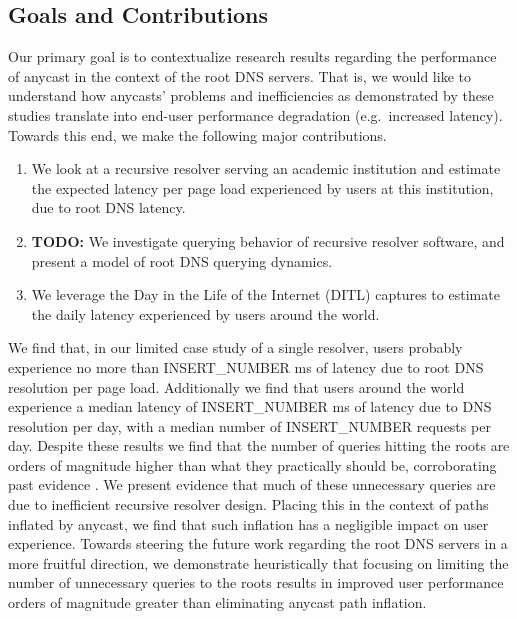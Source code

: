 \documentclass[sigconf,nonacm,10pt]{acmart}
\begin{document}
\subsection{Goals and Contributions}\label{goals-and-contributions}

\label{sec:goals_and_contrib} Our primary goal is to contextualize
research results regarding the performance of anycast in the context of
the root DNS servers. That is, we would like to understand how anycasts'
problems and inefficiencies as demonstrated by these studies translate
into end-user performance degradation (e.g.~increased latency). Towards
this end, we make the following major contributions.

\begin{enumerate}
        \item We look at a recursive resolver serving an academic institution and estimate the expected latency per page load experienced by users at this institution, due to root DNS latency.
        \item \textbf{TODO:} We investigate querying behavior of recursive resolver software, and present a model of root DNS querying dynamics.
\item We leverage the Day in the Life of the Internet (DITL) captures to estimate the daily latency experienced by users around the world.
\end{enumerate}

We find that, in our limited case study of a single resolver, users
probably experience no more than INSERT\_NUMBER ms of latency due to
root DNS resolution per page load. Additionally we find that users
around the world experience a median latency of INSERT\_NUMBER ms of
latency due to DNS resolution per day, with a median number of
INSERT\_NUMBER requests per day. Despite these results we find that the
number of queries hitting the roots are orders of magnitude higher than
what they practically should be, corroborating past evidence \cite{}. We
present evidence that much of these unnecessary queries are due to
inefficient recursive resolver design. \break \break
Placing this in the context of paths inflated by anycast, we find that
such inflation has a negligible impact on user experience. Towards
steering the future work regarding the root DNS servers in a more
fruitful direction, we demonstrate heuristically that focusing on
limiting the number of unnecessary queries to the roots results in
improved user performance orders of magnitude greater than eliminating
anycast path inflation.
\end{document}
